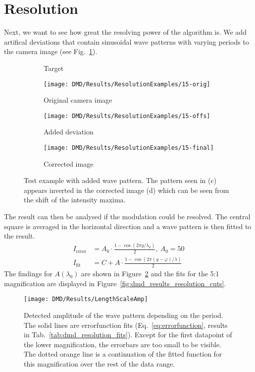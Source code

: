 \section{Resolution}
Next, we want to see how great the resolving power of the algorithm is. We add artifical deviations that contain sinusoidal wave patterns with varying periods to the camera image (see Fig.~\ref{fig:dmd_results_resolution_example}).
\begin{figure}[htbp]
    \centering
    \begin{subfigure}[c]{0.43\textwidth}
        \centering
        \caption{Target}
    \end{subfigure}
    \begin{subfigure}[c]{0.43\textwidth}
        \centering
        \texttt{[image: DMD/Results/ResolutionExamples/15-orig]}
        \caption{Original camera image}
    \end{subfigure}
    \begin{subfigure}[c]{0.43\textwidth}
        \centering
        \texttt{[image: DMD/Results/ResolutionExamples/15-offs]}
        \caption{Added deviation}
    \end{subfigure}
    \begin{subfigure}[c]{0.43\textwidth}
        \centering
        \texttt{[image: DMD/Results/ResolutionExamples/15-final]}
        \caption{Corrected image}
    \end{subfigure}
    \caption[Test example with added wave pattern]{Test example with added wave pattern. The pattern seen in (c) appears inverted in the corrected image (d) which can be seen from the shift of the intensity maxima.}
    \label{fig:dmd_results_resolution_example}
\end{figure}
The result can then be analysed if the modulation could be resolved. The central square is averaged in the horizontal direction and a wave pattern is then fitted to the result.
\begin{align}
    I_\text{error} &=  A_0 \cdot \frac{1-\cos(2\pi y / \lambda_0)}{2},\ A_0 = 50 \\
    I_\text{fit}   &= C + A \cdot \frac{1 - \cos(2\pi (y-\varphi) / \lambda)}{2}
\end{align}
The findings for $A(\lambda_0)$ are shown in Figure~\ref{fig:dmd_results_resolution_amplitude} and the fits for the 5:1 magnification are displayed in Figure~\ref{fig:dmd_results_resolution_cuts}.
\begin{figure}[htbp]
    \centering
    \texttt{[image: DMD/Results/LengthScaleAmp]}
    \caption[Detected amplitude of the wave pattern depending on the period]{Detected amplitude of the wave pattern depending on the period. The solid lines are errorfunction fits (Eq.~\eqref{eq:errorfunction}, results in Tab.~\ref{tab:dmd_resolution_fits}). Except for the first datapoint of the lower magnification, the errorbars are too small to be visible. The dotted orange line is a continuation of the fitted function for this magnification over the rest of the data range.}
    \label{fig:dmd_results_resolution_amplitude}
\end{figure}
